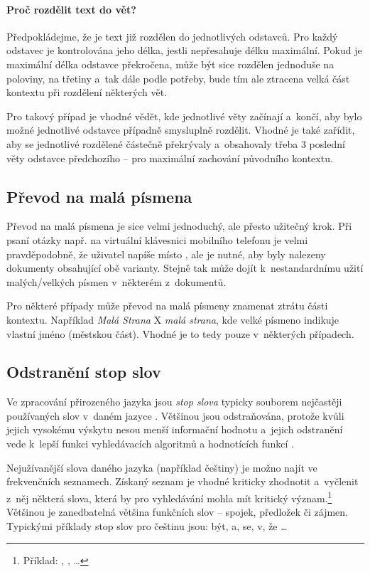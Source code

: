 \paragraph{Proč rozdělit text do vět?}
Předpokládejme, že je text již rozdělen do jednotlivých odstavců. Pro každý odstavec je kontrolována jeho délka, jestli nepřesahuje délku maximální. Pokud je maximální délka odstavce překročena, může být sice rozdělen jednoduše na poloviny, na třetiny a~tak dále podle potřeby, bude tím ale ztracena velká část kontextu při rozdělení některých vět.\par
Pro takový případ je vhodné vědět, kde jednotlivé věty začínají a~končí, aby bylo možné jednotlivé odstavce případně smysluplně rozdělit. Vhodné je také zařídit, aby se jednotlivé rozdělené  částečně překrývaly a~obsahovaly třeba 3 poslední věty odstavce předchozího -- pro maximální zachování původního kontextu.

\subsection{Převod na malá písmena}
\label{prevod_na_mala}
Převod na malá písmena je sice velmi jednoduchý, ale přesto užitečný krok. Při psaní otázky např. na virtuální klávesnici mobilního telefonu je velmi pravděpodobně, že uživatel napíše  místo , ale je nutné, aby byly nalezeny dokumenty obsahující obě varianty. Stejně tak může dojít k~nestandardnímu užití malých/velkých písmen v~některém z~dokumentů.\par
Pro některé případy může převod na malá písmeny znamenat ztrátu části kontextu. Například \emph{Malá Strana} X \emph{malá strana}, kde velké písmeno indikuje vlastní jméno (městskou část). Vhodné je to tedy pouze v~některých případech.

\subsection{Odstranění stop slov}
\label{stopwords}
Ve zpracování přirozeného jazyka jsou \emph{stop slova} typicky souborem nejčastěji používaných slov v~daném jazyce \cite{information_retrieval}. Většinou jsou odstraňována, protože kvůli jejich vysokému výskytu nesou menší informační hodnotu a~jejich odstranění vede k~lepší funkci vyhledávacích algoritmů a hodnotících funkcí \cite{bm25_improvements}.\par
Nejužívanější slova daného jazyka (například češtiny) je možno najít ve frekvenčních seznamech. Získaný seznam je vhodné kriticky zhodnotit a~vyčlenit z~něj některá slova, která by pro vyhledávání mohla mít kritický význam.\footnote{Příklad: , ,  \dots} Většinou je zanedbatelná  většina funkčních slov -- spojek, předložek či zájmen. Typickými příklady stop slov pro češtinu jsou: být, a, se, v, že \dots

